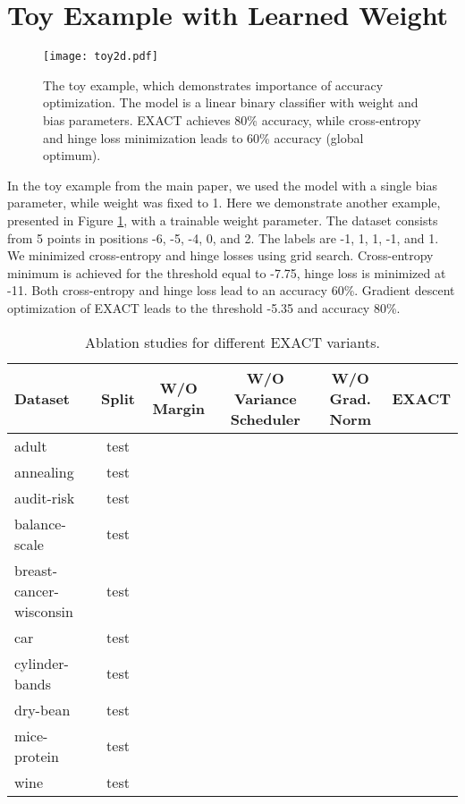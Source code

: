 \documentclass[nohyperref]{article}
\theoremstyle{plain}
\theoremstyle{definition}
\theoremstyle{remark}
\begin{document}
\section{Toy Example with Learned Weight}

\begin{figure}[t]
\vskip 0.2in
\centering
\texttt{[image: toy2d.pdf]}
\caption{The toy example, which demonstrates importance of accuracy optimization. The model is a linear binary classifier with weight and bias parameters. EXACT achieves 80\% accuracy, while cross-entropy and hinge loss minimization leads to 60\% accuracy (global optimum).}
\label{fig:toy2d}
\vskip -0.2in
\end{figure}

In the toy example from the main paper, we used the model with a single bias parameter, while weight was fixed to 1. Here we demonstrate another example, presented in Figure \ref{fig:toy2d}, with a trainable weight parameter. The dataset consists from 5 points in positions -6, -5, -4, 0, and 2. The labels are -1, 1, 1, -1, and 1. We minimized cross-entropy and hinge losses using grid search. Cross-entropy minimum is achieved for the threshold equal to -7.75, hinge loss is minimized at -11. Both cross-entropy and hinge loss lead to an accuracy 60\%. Gradient descent optimization of EXACT leads to the threshold -5.35 and accuracy 80\%.

\begin{table*}[t]
\centering
\begin{tabular}{lc|ccc|c}
Dataset & Split & W/O Margin & W/O Variance Scheduler & W/O Grad. Norm & EXACT \\
\hline

 adult                   & test &       &      &       &       \\
 annealing               & test &       &      &       &  \\
 audit-risk              & test &       &      &       &       \\
 balance-scale           & test &   &  &   &   \\
 breast-cancer-wisconsin & test &       &      &   &   \\
 car                     & test &       &  &   &   \\
 cylinder-bands          & test &       &      &   &   \\
 dry-bean                & test &       &      &       &       \\
 mice-protein            & test &       &      &       &       \\
 wine                    & test &  &      &  &  \\

\end{tabular}

\caption{Ablation studies for different EXACT variants.}
\label{tab:ablations}
\end{table*}
\end{document}
